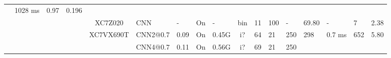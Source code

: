 \begin{table}
\begin{adjustbox}{totalheight=\baselineskip,}
\begin{tabular}{ccccclp{2em}cp{3em}cp{2em}p{4em}p{3em}p{3.5em}p{3.5em}p{2.5em}p{3em}}
                                                       &\multirow{1}{*}{1028 ms}
                                                           &\multirow{1}{*}{0.97}
                                                               &\multirow{1}{*}{0.196}\\
\cmidrule{4-17}
   &   &   &\multirow{1}{*}{\cite{wangAccelerationImplementationConvolutional2019}}
               &\multirow{1}{*}{XC7Z020}
                   &\multirow{1}{*}{CNN}
                       &\multirow{1}{*}{-}
                           &\multirow{1}{*}{On}
                               &\multirow{1}{*}{-}
                                   &\multirow{1}{*}{bin}
                                       &\multirow{1}{*}{11}
                                           &\multirow{1}{*}{100}
                                               &\multirow{1}{*}{-}
                                                   &\multirow{1}{*}{69.80}
                                                       &\multirow{1}{*}{-}
                                                           &\multirow{1}{*}{7}
                                                               &\multirow{1}{*}{2.38}\\
\cmidrule{4-17}
   &   &   &\multirow{3}{*}{\cite{yangAlgorithmHardwareCodesign2022}}
               &\multirow{3}{*}{XC7VX690T}
                   &\multirow{1}{*}{CNN2@0.7}
                       &\multirow{1}{*}{0.09}
                           &\multirow{1}{*}{On}
                               &\multirow{1}{*}{0.45G}
                                   &\multirow{1}{*}{i?}
                                       &\multirow{1}{*}{64}
                                           &\multirow{1}{*}{21}
                                               &\multirow{1}{*}{250}
                                                   &\multirow{1}{*}{298}
                                                       &\multirow{1}{*}{0.7 ms}
                                                           &\multirow{1}{*}{652}
                                                               &\multirow{1}{*}{5.80}\\
   &   &   &   &   &\multirow{1}{*}{CNN4@0.7}
                       &\multirow{1}{*}{0.11}
                           &\multirow{1}{*}{On}
                               &\multirow{1}{*}{0.56G}
                                   &\multirow{1}{*}{i?}
                                       &\multirow{1}{*}{69}
                                           &\multirow{1}{*}{21}
                                               &\multirow{1}{*}{250}

\end{tabular}
\end{adjustbox}
\end{table}
